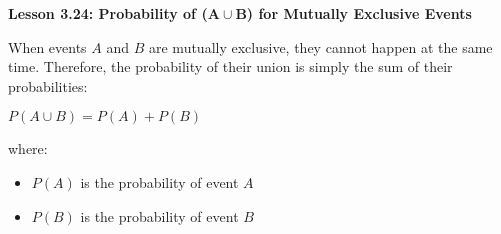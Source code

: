 \begin{center}
\textbf{Lesson 3.24: Probability of (\(\mathbf{A \cup B}\)) for Mutually Exclusive Events}
\end{center}

\vspace*{-1.5ex}

When events \( A \) and \( B \) are mutually exclusive, they cannot happen at the same time. Therefore, the probability of their union is simply the sum of their probabilities:

{\centering $ P(A \cup B) = P(A) + P(B) $\par}

\noindent where:
\begin{itemize}
    \item \( P(A) \) is the probability of event \( A \)
    \item \( P(B) \) is the probability of event \( B \)
\end{itemize}
